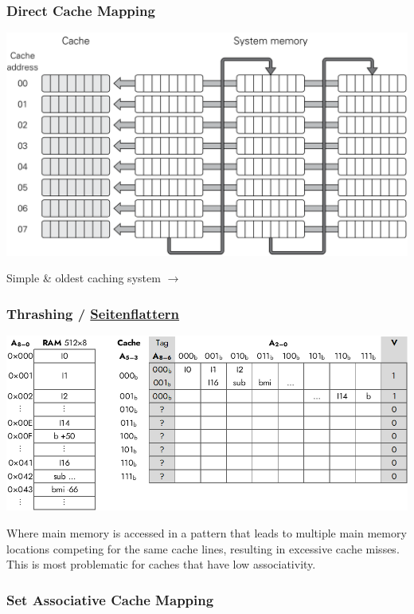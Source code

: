 \documentclass[
  10pt,
  a4paper,
]{article}
\begin{document}
\begin{multicols*}{2}
\subsubsection{Direct Cache Mapping}\label{direct-cache-mapping}

\includegraphics{images/performance/image-9.png}

Simple \& oldest caching system \(\rightarrow\)

\subsubsection{\texorpdfstring{Thrashing /
\href{https://de.wikipedia.org/wiki/Seitenflattern}{Seitenflattern}}{Thrashing / Seitenflattern}}\label{thrashing-seitenflattern}

\includegraphics{images/performance/image-6.png}

Where main memory is accessed in a pattern that leads to multiple main
memory locations competing for the same cache lines, resulting in
excessive cache misses. This is most problematic for caches that have
low associativity.

\subsubsection{Set Associative Cache
Mapping}\label{set-associative-cache-mapping}


\end{multicols*}
\end{document}

